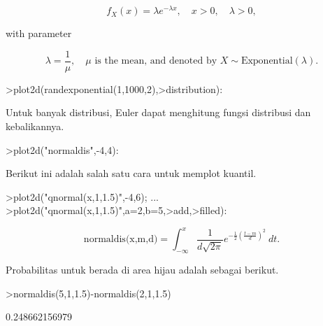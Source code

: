 \documentclass[a4paper,10pt]{article}
\begin{document}
\begin{eulernotebook}
\begin{eulercomment}
\begin{eulercomment}
\begin{eulercomment}
\begin{eulercomment}
\begin{eulercomment}
\begin{eulercomment}
\begin{eulercomment}
\begin{eulercomment}
\begin{eulercomment}
\begin{eulercomment}
\begin{eulercomment}
\begin{eulercomment}
\begin{eulercomment}
\begin{eulercomment}
\begin{eulercomment}
\begin{eulercomment}
\begin{eulercomment}
\begin{eulercomment}
\begin{eulercomment}
\end{eulercomment}
\begin{eulerformula}
\[
f_X(x)=\lambda e^{-\lambda x},\quad x>0,\quad \lambda>0,
\]
\end{eulerformula}
\begin{eulercomment}
with parameter\\
\end{eulercomment}
\begin{eulerformula}
\[
\lambda=\frac{1}{\mu},\quad \mu \text{ is the mean, and denoted by } X \sim \text{Exponential}(\lambda).
\]
\end{eulerformula}
\begin{eulerprompt}
>plot2d(randexponential(1,1000,2),>distribution):
\end{eulerprompt}
\begin{eulercomment}
Untuk banyak distribusi, Euler dapat menghitung fungsi distribusi dan
kebalikannya.
\end{eulercomment}
\begin{eulerprompt}
>plot2d("normaldis",-4,4): 
\end{eulerprompt}
\begin{eulercomment}
Berikut ini adalah salah satu cara untuk memplot kuantil.
\end{eulercomment}
\begin{eulerprompt}
>plot2d("qnormal(x,1,1.5)",-4,6);  ...
>plot2d("qnormal(x,1,1.5)",a=2,b=5,>add,>filled):
\end{eulerprompt}
\begin{eulerformula}
\[
\text{normaldis(x,m,d)}=\int_{-\infty}^x \frac{1}{d\sqrt{2\pi}}e^{-\frac{1}{2}(\frac{t-m}{d})^2}\ dt.
\]
\end{eulerformula}
\begin{eulercomment}
Probabilitas untuk berada di area hijau adalah sebagai berikut.
\end{eulercomment}
\begin{eulerprompt}
>normaldis(5,1,1.5)-normaldis(2,1,1.5)
\end{eulerprompt}
\begin{euleroutput}
  0.248662156979
\end{euleroutput}
\begin{eulercomment}

\end{eulercomment}
\end{eulercomment}
\end{eulercomment}
\end{eulercomment}
\end{eulercomment}
\end{eulercomment}
\end{eulercomment}
\end{eulercomment}
\end{eulercomment}
\end{eulercomment}
\end{eulercomment}
\end{eulercomment}
\end{eulercomment}
\end{eulercomment}
\end{eulercomment}
\end{eulercomment}
\end{eulercomment}
\end{eulercomment}
\end{eulercomment}
\end{eulernotebook}
\end{document}
